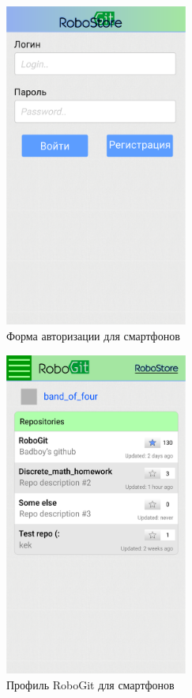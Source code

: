 \documentclass[12pt, a4paper]{article}
\begin{document}
\begin{figure}[H]
  \centering
  \includegraphics[width=6cm]{png/auth_smart.png}
  \caption{Форма авторизации для смартфонов}
\end{figure}

\begin{figure}[H]
  \centering
  \includegraphics[width=6cm]{png/git_profile_smart.png}
  \caption{Профиль RoboGit для смартфонов}
\end{figure}
\end{document}
